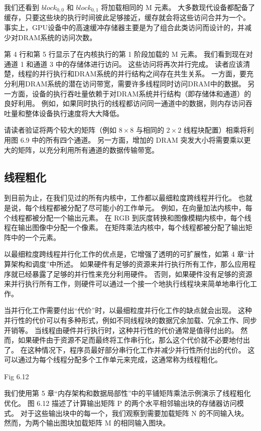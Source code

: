 我们还看到 $block_{0,0}$ 和 $block_{0,1}$ 将加载相同的 M 元素。 
大多数现代设备都配备了缓存，只要这些块的执行时间彼此足够接近，缓存就会将这些访问合并为一个。 
事实上，GPU设备中的高速缓冲存储器主要是为了组合此类访问而设计的，并减少对DRAM系统的访问次数。

第 4 行和第 5 行显示了在内核执行的第 1 阶段加载的 M 元素。 我们看到现在对通道 1 和通道 3 中的存储体进行访问。
这些访问将再次并行完成。 读者应该清楚，线程的并行执行和DRAM系统的并行结构之间存在共生关系。 
一方面，要充分利用DRAM系统的潜在访问带宽，需要许多线程同时访问DRAM中的数据。 
另一方面，设备的执行吞吐量依赖于对DRAM系统并行结构（即存储体和通道）的良好利用。 
例如，如果同时执行的线程都访问同一通道中的数据，则内存访问吞吐量和整体设备执行速度将大大降低。

请读者验证将两个较大的矩阵（例如 $8 \times 8$ 与相同的 $2 \times 2$ 线程块配置）相乘将利用图 6.9 中的所有四个通道。 
另一方面，增加的 DRAM 突发大小将需要乘以更大的矩阵，以充分利用所有通道的数据传输带宽。

\subsection{线程粗化}
到目前为止，在我们见过的所有内核中，工作都以最细粒度跨线程并行化。 也就是说，每个线程都被分配了尽可能小的工作单元。 
例如，在向量加法内核中，每个线程都被分配一个输出元素。 
在 RGB 到灰度转换和图像模糊内核中，每个线程在输出图像中分配一个像素。 
在矩阵乘法内核中，每个线程都被分配了输出矩阵中的一个元素。

以最细粒度跨线程并行化工作的优点是，它增强了透明的可扩展性，如第 4 章“计算架构和调度”中所述。 
如果硬件有足够的资源来并行执行所有工作，那么应用程序就已经暴露了足够的并行性来充分利用硬件。 
否则，如果硬件没有足够的资源来并行执行所有工作，则硬件可以通过一个接一个地执行线程块来简单地串行化工作。

当并行化工作需要付出“代价”时，以最细粒度并行化工作的缺点就会出现。 
这种并行性的代价可以有多种形式，例如不同线程块的数据冗余加载、冗余工作、同步开销等。 
当线程由硬件并行执行时，这种并行性的代价通常是值得付出的。 
然而，如果硬件由于资源不足而最终将工作串行化，那么这个代价就不必要地付出了。 
在这种情况下，程序员最好部分串行化工作并减少并行性所付出的代价。 
这可以通过为每个线程分配多个工作单元来完成，这通常称为线程粗化。

{\color{red} Fig 6.12}

我们使用第 5 章“内存架构和数据局部性”中的平铺矩阵乘法示例演示了线程粗化优化。 
图 6.12 描述了计算输出矩阵 P 的两个水平相邻输出块的存储器访问模式。
对于这些输出块中的每一个，我们观察到需要加载矩阵 N 的不同输入块。 然而，为两个输出图块加载矩阵 M 的相同输入图块。

